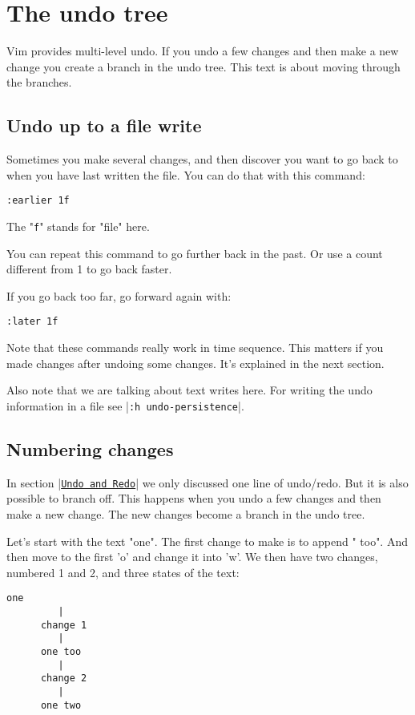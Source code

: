\section{The undo tree}
Vim provides multi-level undo.
If you undo a few changes and then make a new change you create a branch in the undo tree.
This text is about moving through the branches.
\subsection{Undo up to a file write}
Sometimes you make several changes, and then discover you want to go back to when you have last written the file.
You can do that with this command:

\begin{Verbatim}[samepage=true]
 :earlier 1f
\end{Verbatim}

The "\verb!f!" stands for "file" here.

You can repeat this command to go further back in the past.
Or use a count different from 1 to go back faster.

If you go back too far, go forward again with:

\begin{Verbatim}[samepage=true]
 :later 1f
\end{Verbatim}

Note that these commands really work in time sequence.
This matters if you made changes after undoing some changes.
It's explained in the next section.

Also note that we are talking about text writes here.
For writing the undo information in a file see |\verb!:h undo-persistence!|.
\subsection{Numbering changes}
\label{Numbering changes}
In section |\hyperref[Undo and Redo]{\texttt{Undo and Redo}}| we only discussed one line of undo/redo.
But it is also possible to branch off.
This happens when you undo a few changes and then make a new change.
The new changes become a branch in the undo tree.

Let's start with the text "one".
The first change to make is to append " too".
And then move to the first 'o' and change it into 'w'.
We then have two changes, numbered 1 and 2, and three states of the text:

\begin{Verbatim}[samepage=true]
        one 
         |
      change 1
         |
      one too 
         |
      change 2
         |
      one two 
\end{Verbatim}

